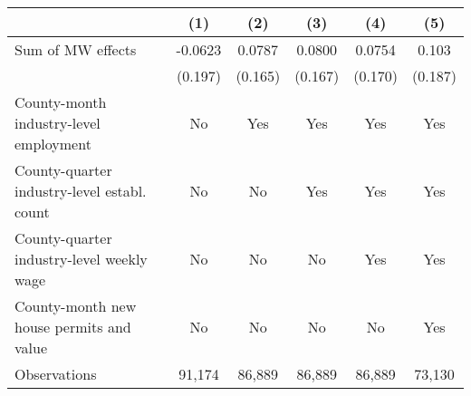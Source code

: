{
\def\sym#1{\ifmmode^{#1}\else\(^{#1}\)\fi}
\begin{tabular}{l*{5}{c}}
\hline\hline
          &\multicolumn{1}{c}{(1)}         &\multicolumn{1}{c}{(2)}         &\multicolumn{1}{c}{(3)}         &\multicolumn{1}{c}{(4)}         &\multicolumn{1}{c}{(5)}         \\
\hline
Sum of MW effects&  -0.0623         &   0.0787         &   0.0800         &   0.0754         &    0.103         \\
          &  (0.197)         &  (0.165)         &  (0.167)         &  (0.170)         &  (0.187)         \\
\hline
County-month industry-level employment&       No         &      Yes         &      Yes         &      Yes         &      Yes         \\
County-quarter industry-level establ. count&       No         &       No         &      Yes         &      Yes         &      Yes         \\
County-quarter industry-level weekly wage&       No         &       No         &       No         &      Yes         &      Yes         \\
County-month new house permits and value&       No         &       No         &       No         &       No         &      Yes         \\
Observations&   91,174         &   86,889         &   86,889         &   86,889         &   73,130         \\
\hline\hline
\end{tabular}
}
